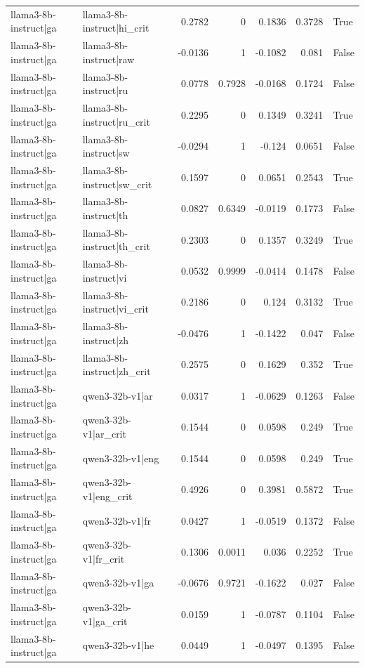 \begin{table}
\begin{tabular}{l l r r r r l}
llama3-8b-instruct|ga & llama3-8b-instruct|hi_crit & 0.2782 & 0 & 0.1836 & 0.3728 & True \\
llama3-8b-instruct|ga & llama3-8b-instruct|raw & -0.0136 & 1 & -0.1082 & 0.081 & False \\
llama3-8b-instruct|ga & llama3-8b-instruct|ru & 0.0778 & 0.7928 & -0.0168 & 0.1724 & False \\
llama3-8b-instruct|ga & llama3-8b-instruct|ru_crit & 0.2295 & 0 & 0.1349 & 0.3241 & True \\
llama3-8b-instruct|ga & llama3-8b-instruct|sw & -0.0294 & 1 & -0.124 & 0.0651 & False \\
llama3-8b-instruct|ga & llama3-8b-instruct|sw_crit & 0.1597 & 0 & 0.0651 & 0.2543 & True \\
llama3-8b-instruct|ga & llama3-8b-instruct|th & 0.0827 & 0.6349 & -0.0119 & 0.1773 & False \\
llama3-8b-instruct|ga & llama3-8b-instruct|th_crit & 0.2303 & 0 & 0.1357 & 0.3249 & True \\
llama3-8b-instruct|ga & llama3-8b-instruct|vi & 0.0532 & 0.9999 & -0.0414 & 0.1478 & False \\
llama3-8b-instruct|ga & llama3-8b-instruct|vi_crit & 0.2186 & 0 & 0.124 & 0.3132 & True \\
llama3-8b-instruct|ga & llama3-8b-instruct|zh & -0.0476 & 1 & -0.1422 & 0.047 & False \\
llama3-8b-instruct|ga & llama3-8b-instruct|zh_crit & 0.2575 & 0 & 0.1629 & 0.352 & True \\
llama3-8b-instruct|ga & qwen3-32b-v1|ar & 0.0317 & 1 & -0.0629 & 0.1263 & False \\
llama3-8b-instruct|ga & qwen3-32b-v1|ar_crit & 0.1544 & 0 & 0.0598 & 0.249 & True \\
llama3-8b-instruct|ga & qwen3-32b-v1|eng & 0.1544 & 0 & 0.0598 & 0.249 & True \\
llama3-8b-instruct|ga & qwen3-32b-v1|eng_crit & 0.4926 & 0 & 0.3981 & 0.5872 & True \\
llama3-8b-instruct|ga & qwen3-32b-v1|fr & 0.0427 & 1 & -0.0519 & 0.1372 & False \\
llama3-8b-instruct|ga & qwen3-32b-v1|fr_crit & 0.1306 & 0.0011 & 0.036 & 0.2252 & True \\
llama3-8b-instruct|ga & qwen3-32b-v1|ga & -0.0676 & 0.9721 & -0.1622 & 0.027 & False \\
llama3-8b-instruct|ga & qwen3-32b-v1|ga_crit & 0.0159 & 1 & -0.0787 & 0.1104 & False \\
llama3-8b-instruct|ga & qwen3-32b-v1|he & 0.0449 & 1 & -0.0497 & 0.1395 & False \\

\end{tabular}
\end{table}
